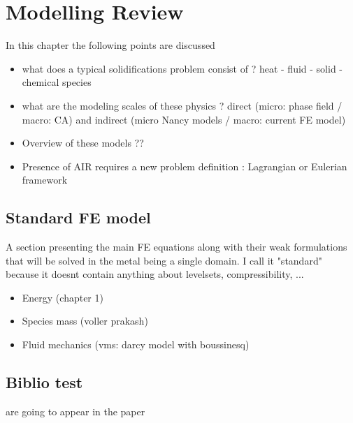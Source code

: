 \chapter{Modelling Review}
\minitoc
\newpage

In this chapter the following points are discussed
\begin{itemize}
\item what does a typical solidifications problem consist of ? heat - fluid - solid 
- chemical species
\item what are the modeling scales of these physics ? direct (micro: phase field / macro: CA) 
and indirect (micro Nancy models / macro: current FE model)
\item Overview of these models ??
\item Presence of AIR requires a new problem definition : Lagrangian or Eulerian framework
\end{itemize}


\section{Standard FE model}
A section presenting the main FE equations along with their weak formulations that will be solved 
in the metal being a single domain. I call it "standard" because it doesnt contain anything about 
levelsets, compressibility, ...
\begin{itemize}
\item Energy (chapter 1)
\item Species mass (voller prakash) 
\item Fluid mechanics (vms: darcy model with boussinesq)
\end{itemize}

\section{Biblio test}
\cite{carozzani_direct_2013} are going to appear in the paper 